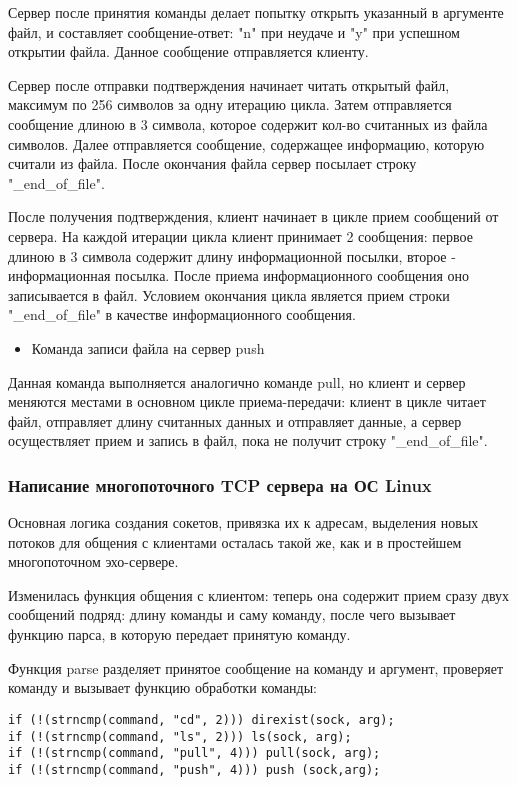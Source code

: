 Сервер после принятия команды делает попытку открыть указанный в аргументе файл, и составляет сообщение-ответ: "n" при неудаче и "y" при успешном открытии файла. Данное сообщение отправляется клиенту.

Сервер после отправки подтверждения начинает читать открытый файл, максимум по 256 символов за одну итерацию цикла. Затем отправляется сообщение длиною в 3 символа, которое содержит кол-во считанных из файла символов. Далее отправляется сообщение, содержащее информацию, которую считали из файла. После окончания файла сервер посылает строку "\_end\_of\_file".

После получения подтверждения, клиент начинает в цикле прием сообщений от сервера. На каждой итерации цикла клиент принимает 2 сообщения: первое длиною в 3 символа содержит длину информационной посылки, второе - информационная посылка. После приема информационного сообщения оно записывается в файл. Условием окончания цикла является прием строки "\_end\_of\_file" в качестве информационного сообщения. 

\begin{itemize}
\item Команда записи файла на сервер push
\end{itemize}

Данная команда выполняется аналогично команде pull, но клиент и сервер меняются местами в основном цикле приема-передачи: клиент в цикле читает файл, отправляет длину считанных данных и отправляет данные, а сервер осуществляет прием и запись в файл, пока не получит строку "\_end\_of\_file".

\subsubsection{Написание многопоточного TCP сервера на ОС Linux}
Основная логика создания сокетов, привязка их к адресам, выделения новых потоков для общения с клиентами осталась такой же, как и в простейшем многопоточном эхо-сервере.

Изменилась функция общения с клиентом: теперь она содержит прием сразу двух сообщений подряд: длину команды и саму команду, после чего вызывает функцию парса, в которую передает принятую команду. 

Функция parse разделяет принятое сообщение на команду и аргумент, проверяет команду и вызывает функцию обработки команды:
\begin{lstlisting}
if (!(strncmp(command, "cd", 2))) direxist(sock, arg);
if (!(strncmp(command, "ls", 2))) ls(sock, arg);
if (!(strncmp(command, "pull", 4))) pull(sock, arg);
if (!(strncmp(command, "push", 4))) push (sock,arg);
\end{lstlisting}

